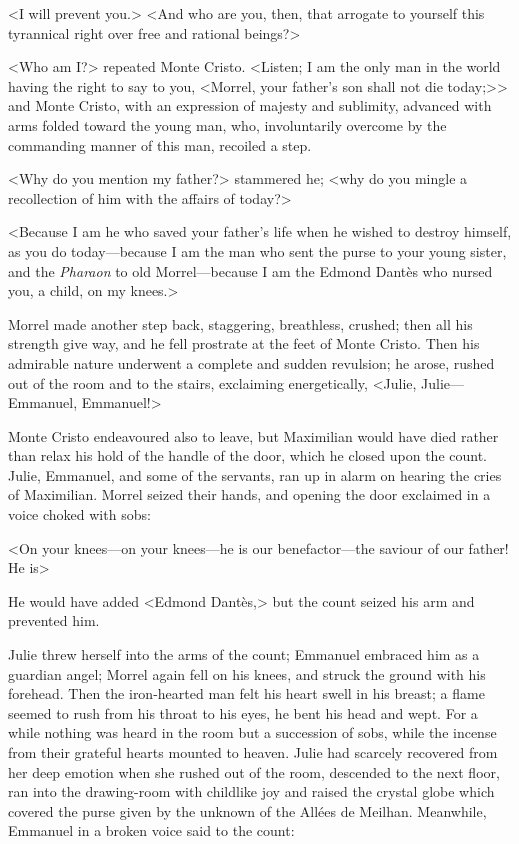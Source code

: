  <I will prevent you.>  <And who are you, then, that arrogate to yourself this tyrannical right over free and rational beings?> 

 <Who am I?> repeated Monte Cristo. <Listen; I am the only man in the world having the right to say to you, <Morrel, your father's son shall not die today;>> and Monte Cristo, with an expression of majesty and sublimity, advanced with arms folded toward the young man, who, involuntarily overcome by the commanding manner of this man, recoiled a step. 

 <Why do you mention my father?> stammered he; <why do you mingle a recollection of him with the affairs of today?> 

 <Because I am he who saved your father's life when he wished to destroy himself, as you do today—because I am the man who sent the purse to your young sister, and the \textit{Pharaon} to old Morrel—because I am the Edmond Dantès who nursed you, a child, on my knees.> 

 Morrel made another step back, staggering, breathless, crushed; then all his strength give way, and he fell prostrate at the feet of Monte Cristo. Then his admirable nature underwent a complete and sudden revulsion; he arose, rushed out of the room and to the stairs, exclaiming energetically, <Julie, Julie—Emmanuel, Emmanuel!> 

 Monte Cristo endeavoured also to leave, but Maximilian would have died rather than relax his hold of the handle of the door, which he closed upon the count. Julie, Emmanuel, and some of the servants, ran up in alarm on hearing the cries of Maximilian. Morrel seized their hands, and opening the door exclaimed in a voice choked with sobs: 

 <On your knees—on your knees—he is our benefactor—the saviour of our father! He is\longdash> 

 He would have added <Edmond Dantès,> but the count seized his arm and prevented him. 

 Julie threw herself into the arms of the count; Emmanuel embraced him as a guardian angel; Morrel again fell on his knees, and struck the ground with his forehead. Then the iron-hearted man felt his heart swell in his breast; a flame seemed to rush from his throat to his eyes, he bent his head and wept. For a while nothing was heard in the room but a succession of sobs, while the incense from their grateful hearts mounted to heaven. Julie had scarcely recovered from her deep emotion when she rushed out of the room, descended to the next floor, ran into the drawing-room with childlike joy and raised the crystal globe which covered the purse given by the unknown of the Allées de Meilhan. Meanwhile, Emmanuel in a broken voice said to the count: 

